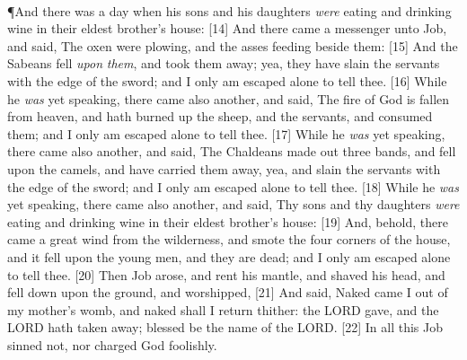 \\
\P \textcolor[cmyk]{0.99998,1,0,0}{And there was a day when his sons and his daughters \emph{were} eating and drinking wine in their eldest brother's house:}
[14] \textcolor[cmyk]{0.99998,1,0,0}{And there came a messenger unto Job, and said, The oxen were plowing, and the asses feeding beside them:}
[15] \textcolor[cmyk]{0.99998,1,0,0}{And the Sabeans fell \emph{upon} \emph{them}, and took them away; yea, they have slain the servants with the edge of the sword; and I only am escaped alone to tell thee.}
[16] \textcolor[cmyk]{0.99998,1,0,0}{While he \emph{was} yet speaking, there came also another, and said, The fire of God is fallen from heaven, and hath burned up the sheep, and the servants, and consumed them; and I only am escaped alone to tell thee.}
[17] \textcolor[cmyk]{0.99998,1,0,0}{While he \emph{was} yet speaking, there came also another, and said, The Chaldeans made out three bands, and fell upon the camels, and have carried them away, yea, and slain the servants with the edge of the sword; and I only am escaped alone to tell thee.}
[18] \textcolor[cmyk]{0.99998,1,0,0}{While he \emph{was} yet speaking, there came also another, and said, Thy sons and thy daughters \emph{were} eating and drinking wine in their eldest brother's house:}
[19] \textcolor[cmyk]{0.99998,1,0,0}{And, behold, there came a great wind from the wilderness, and smote the four corners of the house, and it fell upon the young men, and they are dead; and I only am escaped alone to tell thee.}
[20] \textcolor[cmyk]{0.99998,1,0,0}{Then Job arose, and rent his mantle, and shaved his head, and fell down upon the ground, and worshipped,}
[21] \textcolor[cmyk]{0.99998,1,0,0}{And said, Naked came I out of my mother's womb, and naked shall I return thither: the LORD gave, and the LORD hath taken away; blessed be the name of the LORD.}
[22] \textcolor[cmyk]{0.99998,1,0,0}{In all this Job sinned not, nor charged God foolishly.}